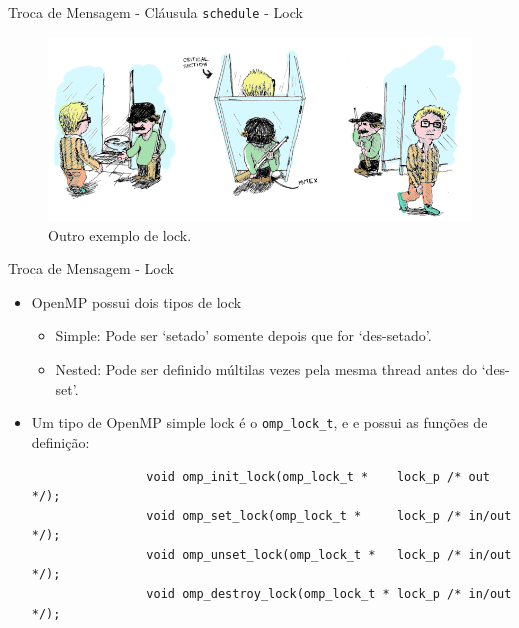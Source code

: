 	\begin{frame}{Troca de Mensagem - Cláusula {\tt schedule} - Lock}
		\begin{figure}[p]
			\centering
			\includegraphics[width=1\textwidth]{img/pacheco/mutex2.png}
			\caption{Outro exemplo de lock.}
		\end{figure}
	\end{frame}

	\begin{frame}[fragile]{Troca de Mensagem -  Lock}
		\begin{itemize}
			\item OpenMP possui dois tipos de lock
			\begin{itemize}
				\item Simple: Pode ser `setado' somente depois que for `des-setado'.
				\item Nested: Pode ser definido múltilas vezes pela mesma thread antes do `des-set'.
			\end{itemize}
			\item Um tipo de OpenMP simple lock é o {\tt omp\_lock\_t}, e e possui as funções de definição:
			\begin{verbatim}
				void omp_init_lock(omp_lock_t *    lock_p /* out */);
				void omp_set_lock(omp_lock_t *     lock_p /* in/out */); 
				void omp_unset_lock(omp_lock_t *   lock_p /* in/out */);  
				void omp_destroy_lock(omp_lock_t * lock_p /* in/out */);    
			\end{verbatim}
		\end{itemize}
\end{frame}


